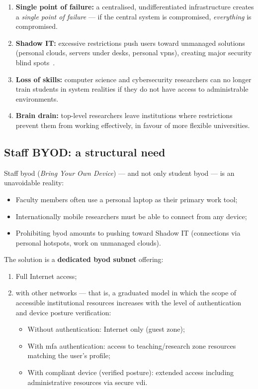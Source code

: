 \begin{enumerate}
    \item \textbf{Single point of failure:} a centralised,
    undifferentiated infrastructure creates a \emph{single point of
    failure} --- if the central system is compromised,
    \emph{everything} is compromised.
    \item \textbf{Shadow IT:} excessive restrictions push users toward
    unmanaged solutions (personal clouds, servers under desks, personal
    \gls{vpn}s), creating major security
    blind spots~\cite{shadow-it-umbc,shadow-it-threatlocker}.
    \item \textbf{Loss of skills:} computer science and cybersecurity
    researchers can no longer train students in system realities if they
    do not have access to administrable environments.
    \item \textbf{Brain drain:} top-level researchers leave institutions
    where restrictions prevent them from working effectively, in favour of
    more flexible universities.
\end{enumerate}

\subsection{Staff BYOD: a structural need}

Staff \gls{byod} (\emph{Bring Your Own Device}) --- and not only
student \gls{byod} --- is an unavoidable reality:

\begin{itemize}[nosep]
    \item Faculty members often use a personal laptop as their primary
    work tool;
    \item Internationally mobile researchers must be able to connect
    from any device;
    \item Prohibiting \gls{byod} amounts to pushing toward Shadow IT
    (connections via personal hotspots, work on unmanaged clouds).
\end{itemize}

The solution is a \textbf{dedicated \gls{byod} subnet} offering:
\begin{enumerate}[nosep]
    \item Full Internet access;
    \item {} with other networks ---
    that is, a graduated model in which the scope of accessible
    institutional resources increases with the level of authentication
    and device posture verification:
    \begin{itemize}[nosep]
        \item Without authentication: Internet only (guest zone);
        \item With \gls{mfa} authentication: access to teaching/research zone
        resources matching the user's profile;
        \item With compliant device (verified posture): extended access
        including administrative resources via secure \gls{vdi}.
    \end{itemize}
\end{enumerate}

